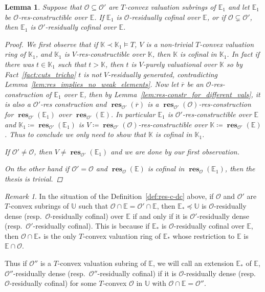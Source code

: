 \documentclass{amsart}
\newtheorem{lemma}[theorem]{Lemma}
\theoremstyle{remark}
\newtheorem{remark}[theorem]{Remark}
\theoremstyle{definition}
\theoremstyle{plain}
\newcommand{\bE}{\mathbb E}
\newcommand{\bK}{\mathbb K}
\newcommand{\bU}{\mathbb U}
\newcommand{\cO}{\mathcal O}
\DeclareMathOperator{\res}{\mathbf{res}}
\theoremstyle{plain}
\begin{document}
\begin{lemma}\label{lem:res_cof}
    Suppose that $\cO\subseteq \cO'$ are $T$-convex valuation subrings of $\bE_1$ and let $\bE_1$ be $\cO$-res-constructible over $\bE$. If $\bE_1$ is $\cO$-residually cofinal over $\bE$, or if $\cO\subsetneq \cO'$, then $\bE_1$ is $\cO'$-residually cofinal over $\bE$.
    \begin{proof}
        We first observe that if $\bK\prec \bK_1\models T$, $V$ is a non-trivial $T$-convex valuation ring of $\bK_1$, and $\bK_1$ is $V$-res-constructible over $\bK$, then $\bK$ is cofinal in $\bK_1$. In fact if there was $t\in \bK_1$ such that $t>\bK$, then $t$ is $V$-purely valuational over $\bK$ so by Fact~\ref{fact:cuts_tricho} $t$ is not $V$-residually generated, contradicting Lemma~\ref{lem:res_implies_no_weak_elements}.
        Now let $\overline{r}$ be an $\cO$-res-construction of $\bE_1$ over $\bE$, then by Lemma~\ref{lem:res-constr_for_different_vals}, it is also a $\cO'$-res construction and $\res_{\cO'}(\overline{r})$ is a $\res_{\cO'}(\cO)$-res-construction for $\res_{\cO'}(\bE_1)$ over $\res_{\cO'}(\bE)$. In particular $\bE_1$ is $\cO'$-res-constructible over $\bE$ and $\bK_1\coloneqq \res_{\cO'}(\bE_1)$ is $V\coloneqq \res_{\cO'}(\cO)$-res-constructible over $\bK\coloneqq \res_{\cO'}(\bE)$. Thus to conclude we only need to show that $\bK$ is cofinal in $\bK_1$.

        If $\cO' \neq \cO$, then $V \neq \res_{\cO'}(\bE_1)$ and we are done by our first observation. 

        On the other hand if $\cO'=\cO$ and $\res_{\cO}(\bE)$ is cofinal in $\res_{\cO}(\bE_1)$, then the thesis is trivial.
    \end{proof}
\end{lemma}

\begin{remark}
    In the situation of the Definition~\ref{def:res-c-dc} above, if $\cO$ and $\cO'$ are $T$-convex subrings of $\bU$ such that $\cO \cap \bE = \cO' \cap \bE$, then $\bE_*\preceq \bU$ is $\cO$-residually dense (resp.\ $\cO$-residually cofinal) over $\bE$ if and only if it is $\cO'$-residually dense (resp.\ $\cO'$-residually cofinal). This is because if $\bE_*$ is $\cO$-residually cofinal over $\bE$, then $\cO \cap \bE_*$ is the only $T$-convex valuation ring of $\bE_*$ whose restriction to $\bE$ is $\bE\cap \cO$.
    
    Thus if $\cO''$ is a $T$-convex valuation subring of $\bE$, we will call an extension $\bE_*$ of $\bE$, $\cO''$-residually dense (resp.\ $\cO''$-residually cofinal) if it is $\cO$-residually dense (resp.\ $\cO$-residually cofinal) for some $T$-convex $\cO$ in $\bU$ with $\cO \cap \bE=\cO''$.
\end{remark}
\end{document}
